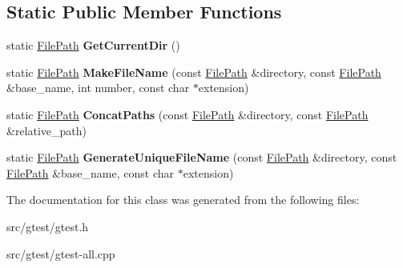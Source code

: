 \subsection*{Static Public Member Functions}
\begin{DoxyCompactItemize}
\item 
\mbox{\label{classtesting_1_1internal_1_1_file_path_aaff39ccd7bfb7a1c09c0220a64326387}} 
static \mbox{\hyperlink{classtesting_1_1internal_1_1_file_path}{File\+Path}} {\bfseries Get\+Current\+Dir} ()
\item 
\mbox{\label{classtesting_1_1internal_1_1_file_path_aa8c102da670261eb4fa8e2f2481df139}} 
static \mbox{\hyperlink{classtesting_1_1internal_1_1_file_path}{File\+Path}} {\bfseries Make\+File\+Name} (const \mbox{\hyperlink{classtesting_1_1internal_1_1_file_path}{File\+Path}} \&directory, const \mbox{\hyperlink{classtesting_1_1internal_1_1_file_path}{File\+Path}} \&base\+\_\+name, int number, const char $\ast$extension)
\item 
\mbox{\label{classtesting_1_1internal_1_1_file_path_ac9d57987f60ac43f0c57b89e333e531e}} 
static \mbox{\hyperlink{classtesting_1_1internal_1_1_file_path}{File\+Path}} {\bfseries Concat\+Paths} (const \mbox{\hyperlink{classtesting_1_1internal_1_1_file_path}{File\+Path}} \&directory, const \mbox{\hyperlink{classtesting_1_1internal_1_1_file_path}{File\+Path}} \&relative\+\_\+path)
\item 
\mbox{\label{classtesting_1_1internal_1_1_file_path_a2280a77adb394cf80bb5f73fc292e8c8}} 
static \mbox{\hyperlink{classtesting_1_1internal_1_1_file_path}{File\+Path}} {\bfseries Generate\+Unique\+File\+Name} (const \mbox{\hyperlink{classtesting_1_1internal_1_1_file_path}{File\+Path}} \&directory, const \mbox{\hyperlink{classtesting_1_1internal_1_1_file_path}{File\+Path}} \&base\+\_\+name, const char $\ast$extension)
\end{DoxyCompactItemize}


The documentation for this class was generated from the following files\+:\begin{DoxyCompactItemize}
\item 
src/gtest/gtest.\+h\item 
src/gtest/gtest-\/all.\+cpp\end{DoxyCompactItemize}
